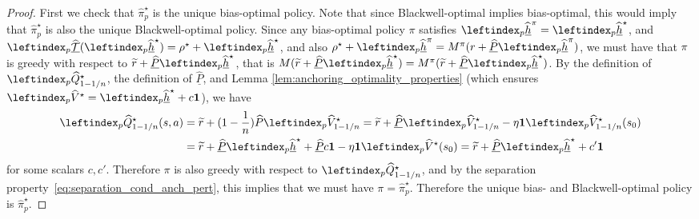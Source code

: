 \documentclass{article}
\theoremstyle{plain}
\theoremstyle{plain}
\theoremstyle{remark}
\theoremstyle{plain}
\theoremstyle{plain}
\newcommand{\Phat}{\widehat{P}}
\newcommand{\Vhat}{\widehat{V}}
\newcommand{\Qhat}{\widehat{Q}}
\newcommand{\one}{\mathbf{1}}
\newcommand{\pihat}{\widehat{\pi}}
\newcommand{\hhat}{\widehat{h}}
\newcommand{\Phatanc}{\underline{\Phat}}
\newcommand{\hhatanc}{\underline{\hhat}}
\newcommand{\Vhatpert}{\leftindex_p{\Vhat}}
\newcommand{\Qhatpert}{\leftindex_p{\Qhat}}
\newcommand{\pihatpert}{\pihat^\star_p}
\newcommand{\Thatancpert}{\leftindex_p{\underline{\widehat{\mathcal{T}}}} }
\newcommand{\hhatancpert}{\leftindex_p{\hhatanc}}
\begin{document}
\begin{proof}
First we check that $\pihatpert$ is the unique bias-optimal policy. Note that since Blackwell-optimal implies bias-optimal, this would imply that $\pihatpert$ is also the unique Blackwell-optimal policy. Since any bias-optimal policy $\pi$ satisfies $\hhatancpert^\pi = \hhatancpert^\star$, and $\Thatancpert(\hhatancpert^\star) = \rho^\star + \hhatancpert^\star$, and also $\rho^\star + \hhatancpert^\pi = M^\pi (r + \Phatanc \hhatancpert^\pi)$, we must have that $\pi$ is greedy with respect to $\widetilde{r} + \Phatanc \hhatancpert^\star$, that is $M(\widetilde{r} + \Phatanc \hhatancpert^\star) = M^\pi(\widetilde{r} + \Phatanc \hhatancpert^\star)$. By the definition of $\Qhatpert_{1-1/n}^\star$, the definition of $\Phatanc$, and Lemma \ref{lem:anchoring_optimality_properties} (which ensures $\Vhatpert^\star = \hhatancpert^\star + c \one$), we have
\begin{align*}
    \Qhatpert_{1-1/n}^\star(s, a) &= \widetilde{r} + (1-\frac{1}{n})\Phat \Vhatpert_{1-1/n}^\star = \widetilde{r} + \Phatanc \Vhatpert_{1-1/n}^\star - \eta \one \Vhatpert_{1-1/n}^\star(s_0) \\
    &= \widetilde{r} + \Phatanc \hhatancpert^\star  + \Phatanc c \one - \eta \one \Vhatpert^\star(s_0) 
     = \widetilde{r} + \Phatanc \hhatancpert^\star + c' \one
\end{align*}
for some scalars $c, c'$. Therefore $\pi$ is also greedy with respect to $\Qhatpert^\star_{1-1/n}$, and by the separation property~\eqref{eq:separation_cond_anch_pert}, this implies that we must have $\pi = \pihatpert$. Therefore the unique bias- and Blackwell-optimal policy is $\pihatpert$.


\end{proof}
\end{document}
